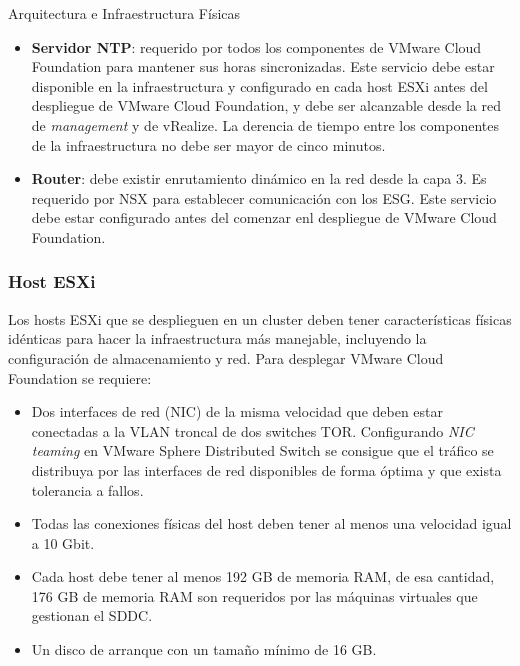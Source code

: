 \begin{subsection}{Arquitectura e Infraestructura Físicas \cite{CFfisInfraestuctura}}
\begin{itemize}
    \item \textbf{Servidor NTP}: requerido por todos los componentes de VMware Cloud Foundation para mantener sus horas sincronizadas. Este servicio debe estar disponible en la infraestructura y configurado en cada host ESXi antes del despliegue de VMware Cloud Foundation, y debe ser alcanzable desde la red de \textit{management} y de vRealize. La derencia de tiempo entre los componentes de la infraestructura no debe ser mayor de cinco minutos.
    
    \item \textbf{Router}: debe existir enrutamiento dinámico en la red desde la capa 3. Es requerido por NSX para establecer comunicación con los ESG. Este servicio debe estar configurado antes del comenzar enl despliegue de VMware Cloud Foundation. 
\end{itemize}

\subsubsection{Host ESXi\cite{WDminRequierements}}
Los hosts ESXi que se desplieguen en un cluster deben tener características físicas idénticas para hacer la infraestructura más manejable,  incluyendo la configuración de almacenamiento y red. Para desplegar VMware Cloud Foundation se requiere:
\begin{itemize}
    \item  Dos interfaces de red (NIC) de la misma velocidad que deben estar conectadas a la VLAN troncal de dos switches TOR. Configurando \textit{NIC teaming} en VMware Sphere Distributed Switch se consigue que el tráfico se distribuya por las interfaces de red disponibles de forma óptima y que exista tolerancia a fallos.
    \item Todas las conexiones físicas del host deben tener al menos una velocidad igual a 10 Gbit.
    \item Cada host debe tener al menos 192 GB de memoria RAM, de esa cantidad, 176 GB de memoria RAM son requeridos por las máquinas virtuales que gestionan el SDDC.
    \item Un disco de arranque con un tamaño mínimo de 16 GB.
\end{itemize}


\end{subsection}
